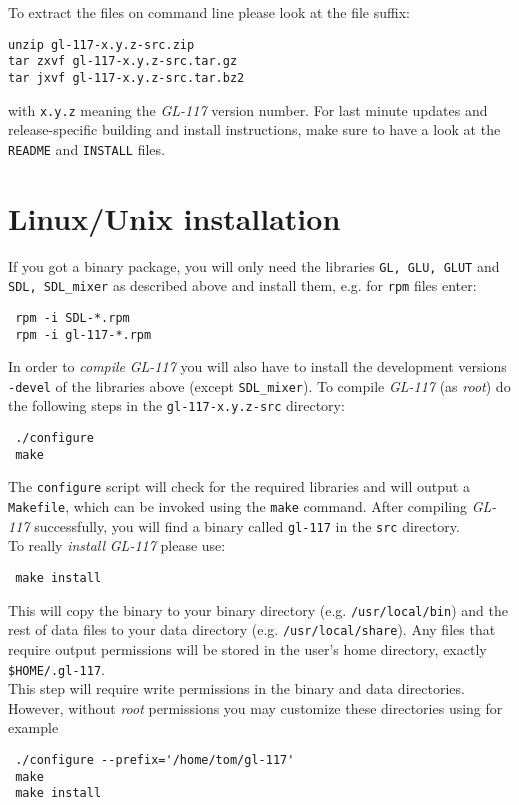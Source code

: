 To extract the files on command line please look at the file suffix:
\begin{verbatim}
unzip gl-117-x.y.z-src.zip
tar zxvf gl-117-x.y.z-src.tar.gz
tar jxvf gl-117-x.y.z-src.tar.bz2
\end{verbatim}
with \texttt{x.y.z} meaning the \emph{GL-117} version
number. For last minute updates and release-specific building and
install instructions, make sure to have a look at the
\texttt{README} and \texttt{INSTALL} files.


\section{Linux/Unix installation}
\label{sec:linux_installation}

If you got a binary package, you will only
need the libraries \texttt{GL, GLU, GLUT} and \texttt{SDL, SDL\_mixer} as
described above and install them, e.g. for \texttt{rpm} files enter:
\begin{verbatim}
 rpm -i SDL-*.rpm
 rpm -i gl-117-*.rpm
\end{verbatim}

In order to \textit{compile} \emph{GL-117} you will also have to install the development
versions \texttt{-devel} of the libraries above (except \texttt{SDL\_mixer}).
To compile \emph{GL-117} (as \textit{root}) do the following steps in the \texttt{gl-117-x.y.z-src}
directory:
\begin{verbatim}
 ./configure
 make
\end{verbatim}

The \texttt{configure} script will check for the required libraries and will output
a \texttt{Makefile}, which can be invoked using the \texttt{make} command.
After compiling \emph{GL-117} successfully, you will find a binary called \texttt{gl-117}
in the \texttt{src} directory.\\
To really \textit{install} \emph{GL-117} please use:
\begin{verbatim}
 make install
\end{verbatim}
This will copy the binary to your binary directory (e.g. \texttt{/usr/local/bin})
and the rest of data files to your data directory (e.g. \texttt{/usr/local/share}).
Any files that require output permissions will be stored in the user's home directory,
exactly \texttt{\$HOME/.gl-117}.\\
This step will require write permissions in the binary and data directories.
However, without \textit{root} permissions you may customize these directories using for example
\begin{verbatim}
 ./configure --prefix='/home/tom/gl-117'
 make
 make install
\end{verbatim}

